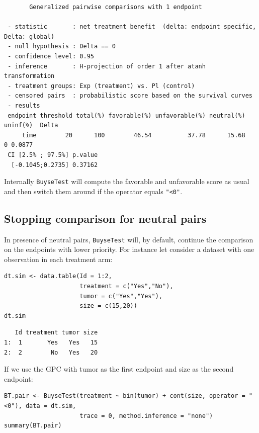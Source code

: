 \documentclass[12pt]{article}
\begin{document}
\begin{verbatim}
       Generalized pairwise comparisons with 1 endpoint

 - statistic       : net treatment benefit  (delta: endpoint specific, Delta: global) 
 - null hypothesis : Delta == 0 
 - confidence level: 0.95 
 - inference       : H-projection of order 1 after atanh transformation 
 - treatment groups: Exp (treatment) vs. Pl (control) 
 - censored pairs  : probabilistic score based on the survival curves
 - results
 endpoint threshold total(%) favorable(%) unfavorable(%) neutral(%) uninf(%)  Delta
     time        20      100        46.54          37.78      15.68        0 0.0877
 CI [2.5% ; 97.5%] p.value 
  [-0.1045;0.2735] 0.37162
\end{verbatim}

Internally \texttt{BuyseTest} will compute the favorable and unfavorable
score as usual and then switch them around if the operator equals
\texttt{"<0"}.

\clearpage

\subsection{Stopping comparison for neutral pairs}
\label{sec:orgba83035}
In presence of neutral pairs, \texttt{BuyseTest} will, by default, continue
the comparison on the endpoints with lower priority. For instance let
consider a dataset with one observation in each treatment arm:
\lstset{language=r,label= ,caption= ,captionpos=b,numbers=none}
\begin{lstlisting}
dt.sim <- data.table(Id = 1:2,
                     treatment = c("Yes","No"),
                     tumor = c("Yes","Yes"),
                     size = c(15,20))
dt.sim
\end{lstlisting}

\begin{verbatim}
   Id treatment tumor size
1:  1       Yes   Yes   15
2:  2        No   Yes   20
\end{verbatim}


\bigskip

If we use the GPC with tumor as the first endpoint and size as the
second endpoint:
\lstset{language=r,label= ,caption= ,captionpos=b,numbers=none}
\begin{lstlisting}
BT.pair <- BuyseTest(treatment ~ bin(tumor) + cont(size, operator = "<0"), data = dt.sim,
                     trace = 0, method.inference = "none")
summary(BT.pair)
\end{lstlisting}
\end{document}
